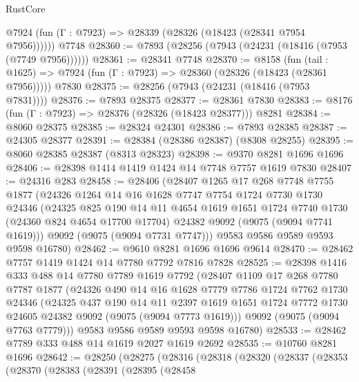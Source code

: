 \begin{lexlean}{RustCore}
\begin{coremodule}
      @7924 (fun (Γ : @7923) => @28339 (@28326 (@18423 (@28341 @7954 @7956))))))
    @7748
@28360 := @7893 (@28256 (@7943 (@24231 (@18416 (@7953 (@7749 @7956))))))
@28361 := @28341 @7748
@28370 := @8158
    (fun (tail : @1625) => @7924 (fun (Γ : @7923) => @28360 (@28326 (@18423 (@28361 @7956)))))
    @7830
@28375 := @28256 (@7943 (@24231 (@18416 (@7953 @7831))))
@28376 := @7893 @28375
@28377 := @28361 @7830
@28383 := @8176 (fun (Γ : @7923) => @28376 (@28326 (@18423 @28377))) @8281
@28384 := @8060 @28375
@28385 := @28324 @24301
@28386 := @7893 @28385
@28387 := @24305 @28377
@28391 := @28384 (@28386 @28387) (@8308 @28255)
@28395 := @8060 @28385 @28387 (@8313 @28323)
@28398 := @9370 @8281 @1696 @1696
@28406 := @28398 @1414 @1419 @1424 @14 @7748 @7757 @1619 @7830
@28407 := @24316 @283
@28458 := @28406
    (@28407
      @1265
      @17
      @268
      @7748
      @7755
      @1877
      (@24326
        @1264
        @14
        @16
        @1628
        @7747
        @7754
        @1724
        @7730
        @1730
        @24346
        (@24325
          @825
          @190
          @14
          @11
          @4654
          @1619
          @1651
          @1724
          @7740
          @1730
          (@24360 @824 @4654 @17700 @17704)
          @24382
          @9092
          (@9075 (@9094 @7741 @1619)))
        @9092
        (@9075 (@9094 @7731 @7747)))
      @9583
      @9586
      @9589
      @9593
      @9598
      @16780)
@28462 := @9610 @8281 @1696 @1696 @9614
@28470 := @28462 @7757 @1419 @1424 @14 @7780 @7792 @7816 @7828
@28525 := @28398
    @1416
    @333
    @488
    @14
    @7780
    @7789
    @1619
    @7792
    (@28407
      @1109
      @17
      @268
      @7780
      @7787
      @1877
      (@24326
        @490
        @14
        @16
        @1628
        @7779
        @7786
        @1724
        @7762
        @1730
        @24346
        (@24325
          @437
          @190
          @14
          @11
          @2397
          @1619
          @1651
          @1724
          @7772
          @1730
          @24605
          @24382
          @9092
          (@9075 (@9094 @7773 @1619)))
        @9092
        (@9075 (@9094 @7763 @7779)))
      @9583
      @9586
      @9589
      @9593
      @9598
      @16780)
@28533 := @28462 @7789 @333 @488 @14 @1619 @2027 @1619 @2692
@28535 := @10760 @8281 @1696
@28642 := @28250
    (@28275
      (@28316
        (@28318
          (@28320
            (@28337
              (@28353
                (@28370
                  (@28383
                    (@28391
                      (@28395
                        (@28458

\end{coremodule}
\end{lexlean}
